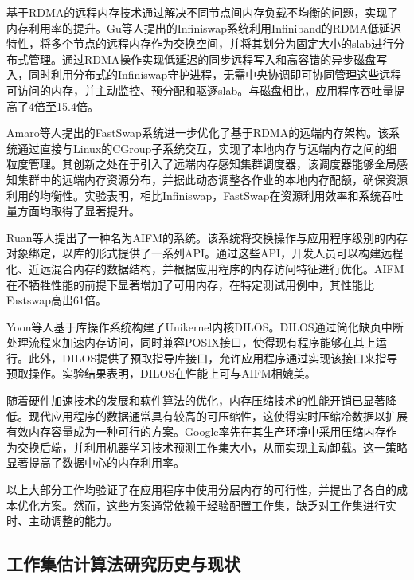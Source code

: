 基于RDMA的远程内存技术通过解决不同节点间内存负载不均衡的问题，实现了内存利用率的提升。Gu等人提出的Infiniswap系统利用Infiniband的RDMA低延迟特性，将多个节点的远程内存作为交换空间，并将其划分为固定大小的slab进行分布式管理。通过RDMA操作实现低延迟的同步远程写入和高容错的异步磁盘写入，同时利用分布式的Infiniswap守护进程，无需中央协调即可协同管理这些远程可访问的内存，并主动监控、预分配和驱逐slab。与磁盘相比，应用程序吞吐量提高了4倍至15.4倍。

Amaro等人提出的FastSwap系统进一步优化了基于RDMA的远端内存架构。该系统通过直接与Linux的CGroup子系统交互，实现了本地内存与远端内存之间的细粒度管理。其创新之处在于引入了远端内存感知集群调度器，该调度器能够全局感知集群中的远端内存资源分布，并据此动态调整各作业的本地内存配额，确保资源利用的均衡性。实验表明，相比Infiniswap，FastSwap在资源利用效率和系统吞吐量方面均取得了显著提升。

Ruan等人提出了一种名为AIFM的系统。该系统将交换操作与应用程序级别的内存对象绑定，以库的形式提供了一系列API。通过这些API，开发人员可以构建远程化、近远混合内存的数据结构，并根据应用程序的内存访问特征进行优化。AIFM在不牺牲性能的前提下显著增加了可用内存，在特定测试用例中，其性能比Fastswap高出61倍。

Yoon等人基于库操作系统构建了Unikernel内核DILOS。DILOS通过简化缺页中断处理流程来加速内存访问，同时兼容POSIX接口，使得现有程序能够在其上运行。此外，DILOS提供了预取指导库接口，允许应用程序通过实现该接口来指导预取操作。实验结果表明，DILOS在性能上可与AIFM相媲美。

随着硬件加速技术的发展和软件算法的优化，内存压缩技术的性能开销已显著降低。现代应用程序的数据通常具有较高的可压缩性，这使得实时压缩冷数据以扩展有效内存容量成为一种可行的方案。Google率先在其生产环境中采用压缩内存作为交换后端，并利用机器学习技术预测工作集大小，从而实现主动卸载。这一策略显著提高了数据中心的内存利用率。

以上大部分工作均验证了在应用程序中使用分层内存的可行性，并提出了各自的成本优化方案。然而，这些方案通常依赖于经验配置工作集，缺乏对工作集进行实时、主动调整的能力。

\subsection{工作集估计算法研究历史与现状}
\label{sec:工作集估计算法研究历史与现状}

